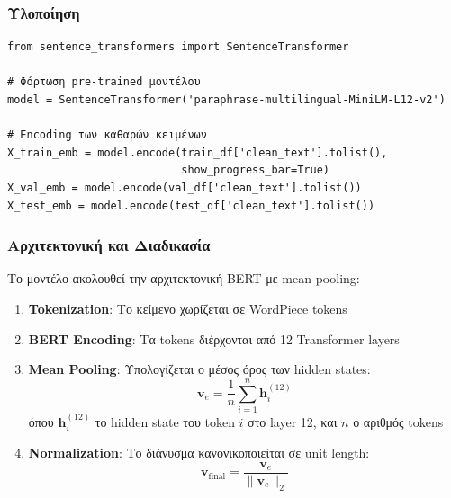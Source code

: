 \documentclass[12pt,a4paper,twoside]{book}
\begin{document}
\subsubsection*{Υλοποίηση}

\begin{tcolorbox}[myCustomStyle={Sentence Transformers}]
    \begin{lstlisting}[style=myPythonStyle]
from sentence_transformers import SentenceTransformer

# Φόρτωση pre-trained μοντέλου
model = SentenceTransformer('paraphrase-multilingual-MiniLM-L12-v2')

# Encoding των καθαρών κειμένων
X_train_emb = model.encode(train_df['clean_text'].tolist(), 
                           show_progress_bar=True)
X_val_emb = model.encode(val_df['clean_text'].tolist())
X_test_emb = model.encode(test_df['clean_text'].tolist())
\end{lstlisting}
\end{tcolorbox}

\subsubsection*{Αρχιτεκτονική και Διαδικασία}

Το μοντέλο ακολουθεί την αρχιτεκτονική BERT με mean pooling:

\begin{enumerate}
    \item \textbf{Tokenization}: Το κείμενο χωρίζεται σε WordPiece tokens
    \item \textbf{BERT Encoding}: Τα tokens διέρχονται από 12 Transformer layers
    \item \textbf{Mean Pooling}: Υπολογίζεται ο μέσος όρος των hidden states:
          \begin{equation}
              \mathbf{v}_e = \frac{1}{n} \sum_{i=1}^{n} \mathbf{h}_i^{(12)}
          \end{equation}
          όπου \(\mathbf{h}_i^{(12)}\) το hidden state του token \(i\) στο layer 12, και \(n\) ο αριθμός tokens

    \item \textbf{Normalization}: Το διάνυσμα κανονικοποιείται σε unit length:
          \begin{equation}
              \mathbf{v}_{\text{final}} = \frac{\mathbf{v}_e}{\|\mathbf{v}_e\|_2}
          \end{equation}
\end{enumerate}
\end{document}
